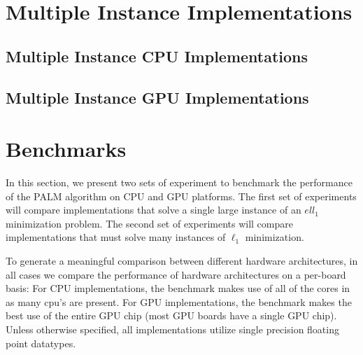 \documentclass[10pt,twocolumn,letterpaper]{article}
\begin{document}
\section{Multiple Instance Implementations}

\subsection{Multiple Instance CPU Implementations}

\subsection{Multiple Instance GPU Implementations}


\section{Benchmarks}
In this section, we present two sets of experiment to benchmark the performance
of the PALM algorithm on CPU and GPU platforms. 
The first set of experiments will compare implementations that solve a single
large instance of an $ell_1$ minimization problem.  
The second set of experiments will compare implementations that must solve
many instances of $\ell_1$ minimization.  

To generate a meaningful comparison between different hardware architectures,
in all cases we compare the performance of hardware architectures on a
per-board basis:  For CPU implementations, the benchmark makes use of all of
the cores in as many cpu's are present.  For GPU implementations, the benchmark
makes the best use of the entire GPU chip (most GPU boards have a single GPU
chip).  Unless otherwise specified, all implementations utilize single
precision floating point datatypes.  
\end{document}

